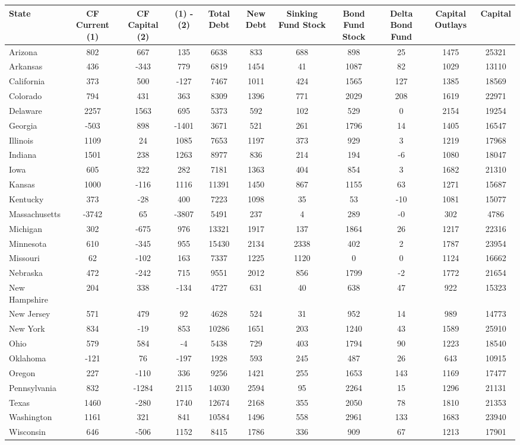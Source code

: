 
\begin{tabularx}{\linewidth}{@{}lCCCCCCCCCC@{}}

\toprule
{State}&{CF Current (1)}&{CF Capital (2)}&{(1) - (2)}&{Total Debt}&{New Debt}&{Sinking Fund Stock}&{Bond Fund Stock}&{Delta Bond Fund}&{Capital Outlays}&{Capital} \tabularnewline
\midrule \addlinespace[\belowrulesep]
Arizona&802&667&135&6638&833&688&898&25&1475&25321 \tabularnewline
Arkansas&436&-343&779&6819&1454&41&1087&82&1029&13110 \tabularnewline
California&373&500&-127&7467&1011&424&1565&127&1385&18569 \tabularnewline
Colorado&794&431&363&8309&1396&771&2029&208&1619&22971 \tabularnewline
Delaware&2257&1563&695&5373&592&102&529&0&2154&19254 \tabularnewline
Georgia&-503&898&-1401&3671&521&261&1796&14&1405&16547 \tabularnewline
Illinois&1109&24&1085&7653&1197&373&929&3&1219&17968 \tabularnewline
Indiana&1501&238&1263&8977&836&214&194&-6&1080&18047 \tabularnewline
Iowa&605&322&282&7181&1363&404&854&3&1682&21310 \tabularnewline
Kansas&1000&-116&1116&11391&1450&867&1155&63&1271&15687 \tabularnewline
Kentucky&373&-28&400&7223&1098&35&53&-10&1081&15077 \tabularnewline
Massachusetts&-3742&65&-3807&5491&237&4&289&-0&302&4786 \tabularnewline
Michigan&302&-675&976&13321&1917&137&1864&26&1217&22316 \tabularnewline
Minnesota&610&-345&955&15430&2134&2338&402&2&1787&23954 \tabularnewline
Missouri&62&-102&163&7337&1225&1120&0&0&1124&16662 \tabularnewline
Nebraska&472&-242&715&9551&2012&856&1799&-2&1772&21654 \tabularnewline
New Hampshire&204&338&-134&4727&631&40&638&47&922&15323 \tabularnewline
New Jersey&571&479&92&4628&524&31&952&14&989&14773 \tabularnewline
New York&834&-19&853&10286&1651&203&1240&43&1589&25910 \tabularnewline
Ohio&579&584&-4&5438&729&403&1794&90&1223&18540 \tabularnewline
Oklahoma&-121&76&-197&1928&593&245&487&26&643&10915 \tabularnewline
Oregon&227&-110&336&9256&1421&255&1653&143&1169&17477 \tabularnewline
Pennsylvania&832&-1284&2115&14030&2594&95&2264&15&1296&21131 \tabularnewline
Texas&1460&-280&1740&12674&2168&355&2050&78&1810&21353 \tabularnewline
Washington&1161&321&841&10584&1496&558&2961&133&1683&23940 \tabularnewline
Wisconsin&646&-506&1152&8415&1786&336&909&67&1213&17901 \tabularnewline
\bottomrule 

\end{tabularx}

